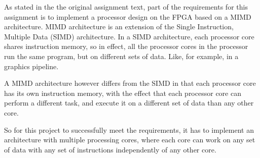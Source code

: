 As stated in the the original assignment text, part of the requirements for this
assignment is to implement a processor design on the FPGA based on a MIMD
architecture. MIMD architecture is an extension of the Single Instruction,
Multiple Data (SIMD) architecture. In a SIMD architecture, each processor core
shares instruction memory, so in effect, all the processor cores in the
processor run the same program, but on different sets of data. Like, for example,
in a graphics pipeline.

A MIMD architecture however differs from the SIMD in that each processor core
has its own instruction memory, with the effect that each processor core can
perform a different task, and execute it on a different set of data than any
other core.

So for this project to successfully meet the requirements, it has to implement
an architecture with multiple processing cores, where each core can work on any
set of data with any set of instructions independently of any other core.
